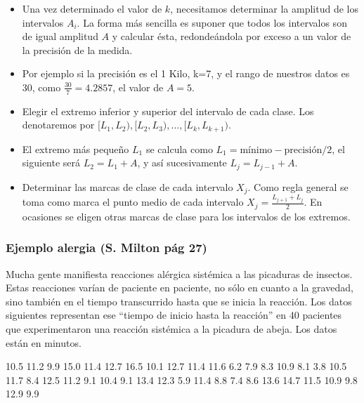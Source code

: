\begin{frame}
\begin{itemize}
\item Una vez determinado el valor de $k$, necesitamos determinar la amplitud de los intervalos $A_i$. La forma más sencilla es suponer que todos los intervalos son de igual amplitud $A$ y calcular ésta, redondeándola por exceso a un valor de la precisión de la medida.
\item Por ejemplo si la precisión es el 1 Kilo, k=7, y el rango de nuestros datos es 30, como $\frac{30}{7}=4.2857$, el valor de $A=5$.
\item Elegir el extremo inferior y superior del intervalo de cada clase. Los denotaremos por $[L_1,L_2),[L_2,L_3),\ldots, [L_k,L_{k+1})$.
\end{itemize}
\end{frame}

\begin{frame}
\begin{itemize}
\item  El extremo más pequeño $L_1$ se calcula como $L_1=\mbox{mínimo}-\mbox{precisión}/2$, el siguiente será $L_2=L_1+A$, y así sucesivamente $L_j=L_{j-1}+A$.
\item Determinar las marcas de clase de cada intervalo $X_j$. Como regla general se toma como marca el punto medio de cada intervalo $X_j=\frac{L_{j+1}+L_j}{2}$. En ocasiones se  eligen otras marcas de clase para los intervalos de los extremos.
\end{itemize}
\end{frame}

\begin{frame}
\frametitle{ Ejemplo alergia (S. Milton pág 27)}
Mucha gente manifiesta reacciones alérgica sistémica a las picaduras de insectos. Estas reacciones varían de paciente en paciente, no sólo en cuanto a la gravedad, sino también en el tiempo transcurrido hasta que se inicia la reacción. Los datos siguientes representan ese ``tiempo de inicio hasta la reacción'' en 40 pacientes que experimentaron una reacción sistémica a la picadura de abeja. Los datos están en minutos.

10.5 11.2 9.9 15.0 11.4 12.7 16.5 10.1 12.7 11.4 11.6 6.2 7.9 8.3 10.9 8.1 3.8 10.5 11.7 8.4 12.5 11.2 9.1 10.4 9.1 13.4 12.3 5.9 11.4 8.8 7.4 8.6 13.6 14.7 11.5 10.9 9.8 12.9 9.9
\end{frame}

